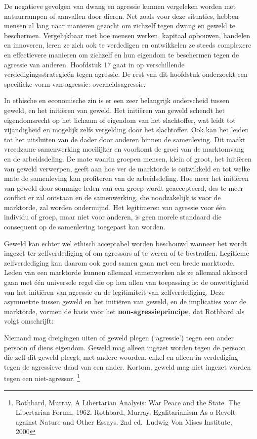 \documentclass[
  a5paper,
  smalldemyvopaper,11pt,twoside,onecolumn,openright,extrafontsizes,
hidelinks]{memoir}
\begin{document}
De negatieve gevolgen van dwang en agressie kunnen vergeleken worden met
natuurrampen of aanvallen door dieren. Net zoals voor deze situaties,
hebben mensen al lang naar manieren gezocht om zichzelf tegen dwang en
geweld te beschermen. Vergelijkbaar met hoe mensen werken, kapitaal
opbouwen, handelen en innoveren, leren ze zich ook te verdedigen en
ontwikkelen ze steeds complexere en effectievere manieren om zichzelf en
hun eigendom te beschermen tegen de agressie van anderen. Hoofdstuk 17
gaat in op verschillende verdedigingsstrategieën tegen agressie. De rest
van dit hoofdstuk onderzoekt een specifieke vorm van agressie:
overheidsagressie.

In ethische en economische zin is er een zeer belangrijk onderscheid
tussen geweld, en het initiëren van geweld. Het initiëren van geweld
schendt het eigendomsrecht op het lichaam of eigendom van het
slachtoffer, wat leidt tot vijandigheid en mogelijk zelfs vergelding
door het slachtoffer. Ook kan het leiden tot het uitsluiten van de dader
door anderen binnen de samenleving. Dit maakt vreedzame samenwerking
moeilijker en voorkomt de groei van de marktomvang en de arbeidsdeling.
De mate waarin groepen mensen, klein of groot, het initiëren van geweld
verwerpen, geeft aan hoe ver de marktorde is ontwikkeld en tot welke
mate de samenleving kan profiteren van de arbeidsdeling. Hoe meer het
initiëren van geweld door sommige leden van een groep wordt
geaccepteerd, des te meer conflict er zal ontstaan en de samenwerking,
die noodzakelijk is voor de marktorde, zal worden ondermijnd. Het
legitimeren van agressie voor één individu of groep, maar niet voor
anderen, is geen morele standaard die consequent op de samenleving
toegepast kan worden.

Geweld kan echter wel ethisch acceptabel worden beschouwd wanneer het
wordt ingezet ter zelfverdediging of om agressors af te weren of te
bestraffen. Legitieme zelfverdediging kan daarom ook goed samen gaan met
een brede marktorde. Leden van een marktorde kunnen allemaal samenwerken
als ze allemaal akkoord gaan met één universele regel die op hen allen
van toepassing is: de onwettigheid van het initiëren van agressie en de
legitimiteit van zelfverdediging. Deze asymmetrie tussen geweld en het
initiëren van geweld, en de implicaties voor de marktorde, vormen de
basis voor het \textbf{non-agressieprincipe}, dat Rothbard als volgt
omschrijft:

Niemand mag dreigingen uiten of geweld plegen (`agressie') tegen een
ander persoon of diens eigendom. Geweld mag alleen ingezet worden tegen
de persoon die zelf dit geweld pleegt; met andere woorden, enkel en
alleen in verdediging tegen de agressieve daad van een ander. Kortom,
geweld mag niet ingezet worden tegen een niet-agressor. \footnote{Rothbard,
  Murray. A Libertarian Analysis: War Peace and the State. The
  Libertarian Forum, 1962. Rothbard, Murray. Egalitarianism As a Revolt
  against Nature and Other Essays. 2nd ed.~Ludwig Von Mises Institute,
  2000}
\end{document}
